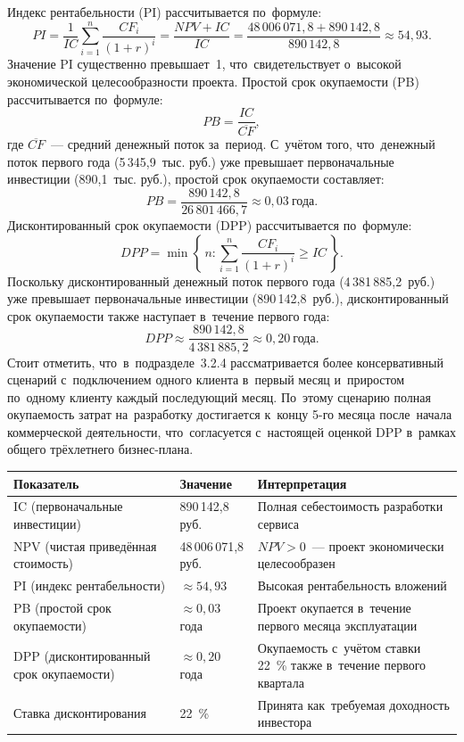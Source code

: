 Индекс рентабельности (PI) рассчитывается по~формуле:
\[ PI = \frac{1}{IC}\sum_{i=1}^{n} \frac{CF_i}{(1+r)^{i}} = \frac{NPV + IC}{IC}
   = \frac{48\,006\,071{,}8 + 890\,142{,}8}{890\,142{,}8} \approx 54{,}93. \]
Значение PI существенно превышает~1, что~свидетельствует о~высокой
экономической целесообразности проекта.
Простой срок окупаемости (PB) рассчитывается по~формуле:
\[ PB = \frac{IC}{\overline{CF}}, \]
где $\overline{CF}$~--- средний денежный поток за~период. С~учётом того,
что~денежный поток первого года (5\,345,9~тыс. руб.) уже превышает
первоначальные инвестиции (890,1~тыс. руб.), простой срок окупаемости
составляет:
\[ PB = \frac{890\,142{,}8}{26\,801\,466{,}7} \approx 0{,}03~\text{года.} \]
Дисконтированный срок окупаемости (DPP) рассчитывается по~формуле:
\[ DPP = \min\left\{\, n : \sum_{i=1}^{n} \frac{CF_i}{(1+r)^{i}} \ge IC \,\right\}. \]
Поскольку дисконтированный денежный поток первого года (4\,381\,885,2~руб.)
уже превышает первоначальные инвестиции (890\,142,8~руб.), дисконтированный
срок окупаемости также наступает в~течение первого года:
\[ DPP \approx \frac{890\,142{,}8}{4\,381\,885{,}2} \approx 0{,}20~\text{года.} \]
Стоит отметить, что~в~подразделе~3.2.4 рассматривается более консервативный
сценарий с~подключением одного клиента в~первый месяц и~приростом по~одному
клиенту каждый последующий месяц. По~этому сценарию полная окупаемость затрат
на~разработку достигается к~концу 5-го месяца после~начала коммерческой
деятельности, что~согласуется с~настоящей оценкой DPP в~рамках общего
трёхлетнего бизнес-плана.

{\small
\begin{longtable}{L{4.8cm} C{3.4cm} L{6.0cm}}
\toprule
Показатель & Значение & Интерпретация \\
\midrule
\endhead
IC (первоначальные инвестиции) & 890\,142,8 руб. & Полная себестоимость разработки сервиса \\
NPV (чистая приведённая стоимость) & 48\,006\,071,8 руб. & $NPV > 0$~--- проект экономически целесообразен \\
PI (индекс рентабельности) & $\approx 54{,}93$ & Высокая рентабельность вложений \\
PB (простой срок окупаемости) & $\approx 0{,}03$ года & Проект окупается в~течение первого месяца эксплуатации \\
DPP (дисконтированный срок окупаемости) & $\approx 0{,}20$ года & Окупаемость с~учётом ставки 22~\% также в~течение первого квартала \\
Ставка дисконтирования & 22~\% & Принята как~требуемая доходность инвестора \\
\bottomrule
\end{longtable}
}

